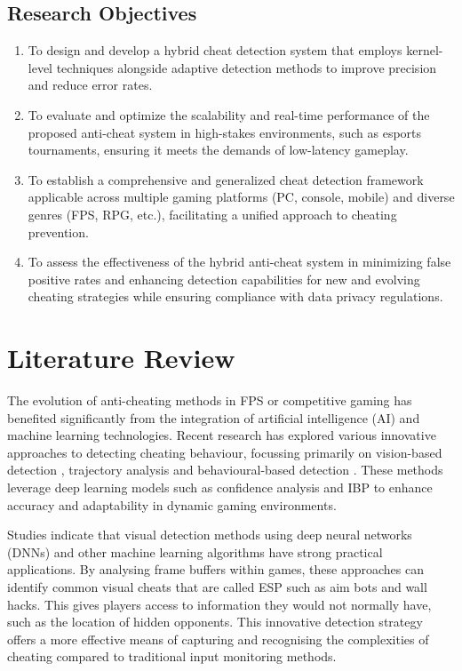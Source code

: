 \documentclass[a4paper, 12pt]{article}
\begin{document}
\subsection{Research Objectives}
\begin{enumerate}
    \item To design and develop a hybrid cheat detection system that employs kernel-level techniques alongside adaptive detection methods to improve precision and reduce error rates.
    \item To evaluate and optimize the scalability and real-time performance of the proposed anti-cheat system in high-stakes environments, such as esports tournaments, ensuring it meets the demands of low-latency gameplay.
    \item To establish a comprehensive and generalized cheat detection framework applicable across multiple gaming platforms (PC, console, mobile) and diverse genres (FPS, RPG, etc.), facilitating a unified approach to cheating prevention.
    \item To assess the effectiveness of the hybrid anti-cheat system in minimizing false positive rates and enhancing detection capabilities for new and evolving cheating strategies while ensuring compliance with data privacy regulations.
\end{enumerate}

\section{Literature Review}
The evolution of anti-cheating methods in FPS or competitive gaming has benefited significantly from the integration of artificial intelligence (AI) and machine learning technologies.  Recent research has explored various innovative approaches to detecting cheating behaviour, focussing primarily on vision-based detection \cite{zhao_2023_vespa}, trajectory analysis \cite{su_2022_fewshot} and behavioural-based detection \cite{cao_2024_beat}. These methods leverage deep learning models such as confidence analysis and IBP to enhance accuracy and adaptability in dynamic gaming environments.

Studies indicate that visual detection methods using deep neural networks (DNNs) \cite{jonnalagadda_2021_robust} and other machine learning algorithms have strong practical applications. By analysing frame buffers within games, these approaches can identify common visual cheats that are called ESP such as aim bots and wall hacks. This gives players access to information they would not normally have, such as the location of hidden opponents. This innovative detection strategy offers a more effective means of capturing and recognising the complexities of cheating compared to traditional input monitoring methods.
\end{document}
